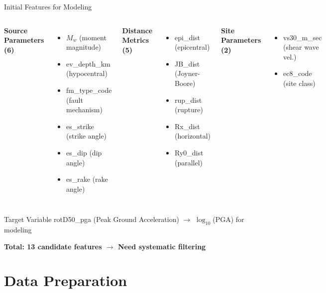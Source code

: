 \documentclass[aspectratio=169,11pt]{beamer}
\begin{document}
\begin{frame}{Initial Features for Modeling}
\begin{columns}[T]
\textbf{Source Parameters (6)}
\begin{itemize}
    \item $M_w$ (moment magnitude)
    \item ev\_depth\_km (hypocentral)
    \item fm\_type\_code (fault mechanism)
    \item es\_strike (strike angle)
    \item es\_dip (dip angle)
    \item es\_rake (rake angle)
\end{itemize}

\textbf{Distance Metrics (5)}
\begin{itemize}
    \item epi\_dist (epicentral)
    \item JB\_dist (Joyner-Boore)
    \item rup\_dist (rupture)
    \item Rx\_dist (horizontal)
    \item Ry0\_dist (parallel)
\end{itemize}

\textbf{Site Parameters (2)}
\begin{itemize}
    \item vs30\_m\_sec (shear wave vel.)
    \item ec8\_code (site class)
\end{itemize}
\end{columns}

\vspace{0.3cm}
\begin{block}{Target Variable}
rotD50\_pga (Peak Ground Acceleration) $\rightarrow$ $\log_{10}$(PGA) for modeling
\end{block}
\vspace{0.2cm}
\centering
\textbf{Total: 13 candidate features $\rightarrow$ Need systematic filtering}
\end{frame}

\section{Data Preparation}
\end{document}
